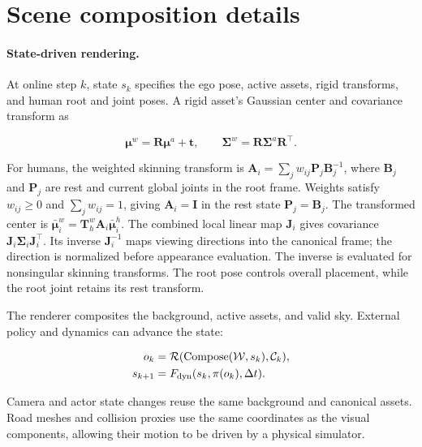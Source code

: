 \section{Scene composition details}
\label{sec:supp-composition}

\paragraph{State-driven rendering.}

At online step $k$, state $s_k$ specifies the ego pose, active assets, rigid transforms, and human root and joint poses. A rigid asset's Gaussian center and covariance transform as

\begin{equation}
\boldsymbol\mu^w=\mathbf R\boldsymbol\mu^a+\mathbf t,
\qquad
\boldsymbol\Sigma^w=\mathbf R\boldsymbol\Sigma^a\mathbf R^\top.
\label{eq:rigid}
\end{equation}

For humans, the weighted skinning transform is $\mathbf A_i=\sum_j w_{ij}\mathbf P_j\mathbf B_j^{-1}$, where $\mathbf B_j$ and $\mathbf P_j$ are rest and current global joints in the root frame. Weights satisfy $w_{ij}\geq0$ and $\sum_j w_{ij}=1$, giving $\mathbf A_i=\mathbf I$ in the rest state $\mathbf P_j=\mathbf B_j$. The transformed center is $\bar{\boldsymbol\mu}_i^w=\mathbf T^w_h\mathbf A_i\bar{\boldsymbol\mu}_i^h$. The combined local linear map $\mathbf J_i$ gives covariance $\mathbf J_i\boldsymbol\Sigma_i\mathbf J_i^\top$. Its inverse $\mathbf J_i^{-1}$ maps viewing directions into the canonical frame; the direction is normalized before appearance evaluation. The inverse is evaluated for nonsingular skinning transforms. The root pose controls overall placement, while the root joint retains its rest transform.

The renderer composites the background, active assets, and valid sky. External policy and dynamics can advance the state:

\begin{align}
o_k&=\mathcal R(\operatorname{Compose}(\mathcal W,s_k),\mathcal C_k),\\
s_{k+1}&=F_{\rm dyn}(s_k,\pi(o_k),\Delta t).
\label{eq:simulation}
\end{align}

Camera and actor state changes reuse the same background and canonical assets. Road meshes and collision proxies use the same coordinates as the visual components, allowing their motion to be driven by a physical simulator.
